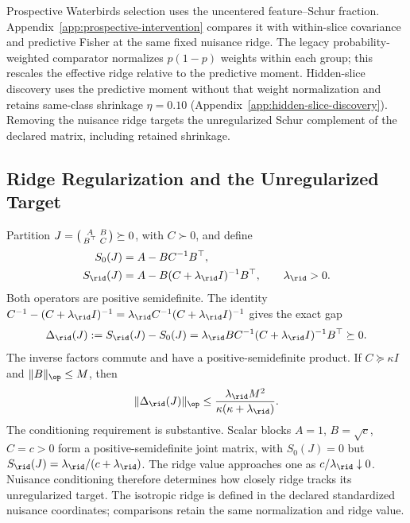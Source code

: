Prospective Waterbirds selection uses the uncentered feature--Schur fraction. Appendix~\ref{app:prospective-intervention} compares it with within-slice covariance and predictive Fisher at the same fixed nuisance ridge. The legacy probability-weighted comparator normalizes $p(1-p)$ weights within each group; this rescales the effective ridge relative to the predictive moment. Hidden-slice discovery uses the predictive moment without that weight normalization and retains same-class shrinkage $\eta=0.10$ (Appendix~\ref{app:hidden-slice-discovery}). Removing the nuisance ridge targets the unregularized Schur complement of the declared matrix, including retained shrinkage.

\subsection{Ridge Regularization and the Unregularized Target}
\label{app:ridge-unregularized}

Partition $J=\begin{psmallmatrix}A&B\\B^\top&C\end{psmallmatrix}\succeq0$, with $C\succ0$, and define
\begin{equation}
\begin{aligned}
S_0(J)&=A-BC^{-1}B^\top,\\
S_{\rid}(J)&=A-B(C+\lambda_{\rid}I)^{-1}B^\top,
\qquad\lambda_{\rid}>0.
\end{aligned}
\label{eq:appB-schur-operators}
\end{equation}
Both operators are positive semidefinite. The identity
$C^{-1}-(C+\lambda_{\rid}I)^{-1}=\lambda_{\rid}C^{-1}(C+\lambda_{\rid}I)^{-1}$ gives the exact gap
\begin{equation}
\Delta_{\rid}(J):=S_{\rid}(J)-S_0(J)
=\lambda_{\rid}BC^{-1}(C+\lambda_{\rid}I)^{-1}B^\top\succeq0.
\label{eq:ridge-exact-gap}
\end{equation}
The inverse factors commute and have a positive-semidefinite product. If $C\succeq\kappa I$ and $\lVert B\rVert_{\op}\le M$, then
\begin{equation}
\lVert\Delta_{\rid}(J)\rVert_{\op}
\le\frac{\lambda_{\rid}M^2}{\kappa(\kappa+\lambda_{\rid})}.
\label{eq:appB-gap-bound}
\end{equation}
The conditioning requirement is substantive. Scalar blocks $A=1$, $B=\sqrt c$, $C=c>0$ form a positive-semidefinite joint matrix, with $S_0(J)=0$ but $S_{\rid}(J)=\lambda_{\rid}/(c+\lambda_{\rid})$. The ridge value approaches one as $c/\lambda_{\rid}\downarrow0$. Nuisance conditioning therefore determines how closely ridge tracks its unregularized target. The isotropic ridge is defined in the declared standardized nuisance coordinates; comparisons retain the same normalization and ridge value.

